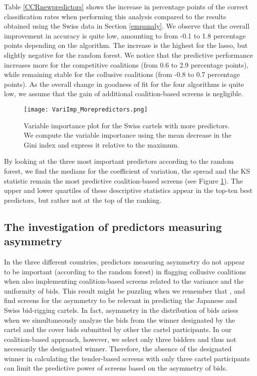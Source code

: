 \documentclass[a4paper,11pt]{article}
\begin{document}
	Table \ref{CCRnewpredictors} shows the increase in percentage points of the correct classification rates when performing this analysis compared to the results obtained using the Swiss data in Section \ref{empanaly}. We observe that the overall improvement in accuracy is quite low, amounting to from -0.1 to 1.8 percentage points depending on the algorithm. The increase is the highest for the lasso, but slightly negative for the random forest. We notice that the predictive performance increases more for the competitive coalitions (from 0.6 to 2.9 percentage points), while remaining stable for the collusive coalitions (from -0.8 to 0.7 percentage points). As the overall change in goodness of fit for the four algorithms is quite low, we assume that the gain of additional coalition-based screens is negligible. 
	
	\begin{figure}[!htp]
		\centering \caption{\label{VarImp_MorePred} Variable importance plot for the Swiss cartels with more predictors. We compute the variable importance using the mean decrease in the Gini index and express it relative to the maximum.}
		\texttt{[image: VariImp\_Morepredictors.png]}
	\end{figure}
	
	By looking at the three most important predictors according to the random forest, we find the medians for the coefficient of variation, the spread and the KS statistic remain the most predictive coalition-based screens (see Figure \ref{VarImp_MorePred}). The upper and lower quartiles of these descriptive statistics appear in the top-ten best predictors, but rather not at the top of the ranking.
	
	
	\subsection{The investigation of predictors measuring asymmetry}
	
	In the three different countries, predictors measuring asymmetry do not appear to be important (according to the random forest) in flagging collusive coalitions when also implementing coalition-based screens related to the variance and the uniformity of bids. This result might be puzzling when we remember that \cite{imhof2019detecting}, \cite{huber2020transnational} and \cite{wallimann2020machine} find screens for the asymmetry to be relevant in predicting the Japanese and Swiss bid-rigging cartels. In fact, asymmetry in the distribution of bids arises when we simultaneously analyze the bids from the winner designated by the cartel and the cover bids submitted by other the cartel participants. In our coalition-based approach, however, we select only three bidders and thus not necessarily the designated winner. Therefore, the absence of the designated winner in calculating the tender-based screens with only three cartel participants can limit the predictive power of screens based on the asymmetry of bids.
	
\end{document}
